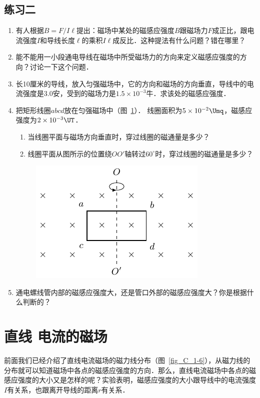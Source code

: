 \subsection*{练习二}
\begin{enumerate}
    \item 有人根据$B=F/I\ell$提出：磁场中某处的磁感应强度$B$跟磁场力$F$成正比，跟电流强度$I$和导线长度$\ell$的乘积$I\ell$成反比．这种提法有什么问题？错在哪里？
    \item 能不能用一小段通电导线在磁场中所受磁场力的方向来定义磁感应强度的方向？讨论一下这个问题．
    \item 长10厘米的导线，放入匀强磁场中，它的方向和磁场的方向垂直，导线中的电流强度是3.0安，受到的磁场力是$1.5\times10^{-3}$牛．求该处的磁感应强度．
    \item 把矩形线圈$abcd$放在匀强磁场中（图~\ref{fig_C_1-19}）．
    线圈面积为$5\times10^{-2}\Umq$，磁感应强度为$2\times10^{-3} \UT$．
     \begin{enumerate}
        \item 当线圈平面与磁场方向垂直时，穿过线圈的磁通量是多少？
        \item 线圈平面从图所示的位置绕$OO'$轴转过$60^\circ$时，穿过线圈的磁通量是多少？
    \end{enumerate}
    \begin{figure}[htbp]
    	\centering
    	\includegraphics{fig/C/1-19.pdf}
    	\caption{}\label{fig_C_1-19}
    \end{figure}
    \item 通电螺线管内部的磁感应强度大，还是管口外部的磁感应强度大？你是根据什么判断的？
\end{enumerate}



\section{直线 电流的磁场}
前面我们已经介绍了直线电流磁场的磁力线分布（图~\ref{fig_C_1-6}），从磁力线的分布就可以知道磁场中各点的磁感应强度的方向．那么，直线电流磁场中各点的磁感应强度的大小又是怎样的呢？实验表明，磁感应强度的大小跟导线中的电流强度$I$有关系，也跟离开导线的距离$r$有关系．


